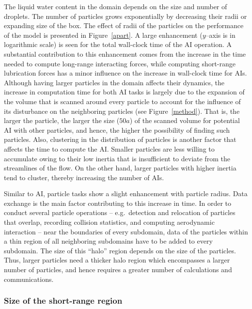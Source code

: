 \documentclass[../thesis.tex]{subfiles}
\begin{document}
The liquid water content in the domain depends on the size and number of droplets. The number of particles grows exponentially by decreasing their radii or expanding size of the box. The effect of radii of the particles on the performance of the model is presented in Figure~\ref{apart}. A large enhancement ($y$--axis is in logarithmic scale) is seen for the total wall-clock time of the AI operation. A substantial contribution to this enhancement comes from the increase in the time needed to compute long-range interacting forces, while computing short-range lubrication forces has a minor influence on the increase in wall-clock time for AIs. Although having larger particles in the domain affects their dynamics, the increase in computation time for both AI tasks is largely due to the expansion of the volume that is scanned around every particle to account for the influence of its disturbance on the neighboring particles (see Figure~\ref{method}). That is, the larger the particle, the larger the size ($50a$) of the scanned volume for potential AI with other particles, and hence, the higher the possibility of finding such particles. Also, clustering in the distribution of particles is another factor that affects the time to compute the AI. Smaller particles are less willing to accumulate owing to their low inertia that is insufficient to deviate from the streamlines of the flow. On the other hand, larger particles with higher inertia tend to cluster, thereby increasing the number of AIs.

Similar to AI, particle tasks show a slight enhancement with particle radius. Data exchange is the main factor contributing to this increase in time. In order to conduct several particle operations -- e.g.~detection and relocation of particles that overlap, recording collision statistics, and computing aerodynamic interaction -- near the boundaries of every subdomain, data of the particles within a thin region of all neighboring subdomains have to be added to every subdomain. The size of this ``halo'' region depends on the size of the particles. Thus, larger particles need a thicker halo region which encompasses a larger number of particles, and hence requires a greater number of calculations and communications.


\subsubsection{Size of the short-range region}
\end{document}
